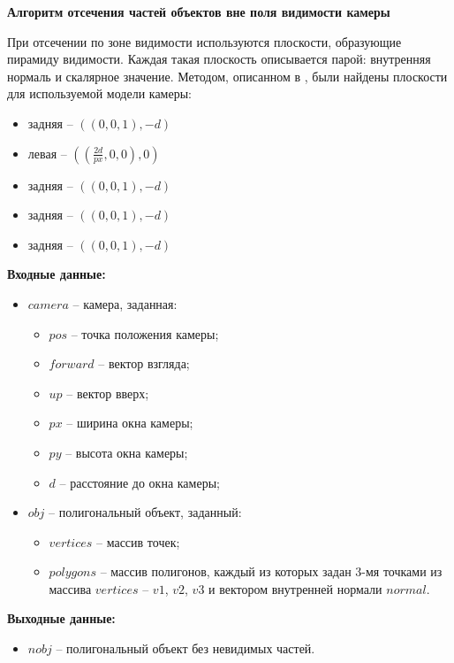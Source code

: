 \textbf{Алгоритм отсечения частей объектов вне поля видимости камеры}

При отсечении по зоне видимости используются плоскости, образующие пирамиду видимости. Каждая такая плоскость описывается парой: внутренняя нормаль и скалярное значение. Методом, описанном в \cite{gabriella}, были найдены плоскости для используемой модели камеры:

\begin{itemize}
	
\begin{itemize}
	\item задняя -- $((0, 0, 1), -d)$
	\item левая -- $((\frac{2d}{px}, 0, 0), 0)$
	\item задняя -- $((0, 0, 1), -d)$
	\item задняя -- $((0, 0, 1), -d)$
	\item задняя -- $((0, 0, 1), -d)$
\end{itemize}  

\textbf{Входные данные:}
\begin{itemize}
	\item $camera$ -- камера, заданная:
	\begin{itemize}
		\item $pos$ -- точка положения камеры;
		\item $forward$ -- вектор взгляда;
		\item $up$ -- вектор вверх;
		\item $px$ -- ширина окна камеры;
		\item $py$ -- высота окна камеры;
		\item $d$ -- расстояние до окна камеры;
	\end{itemize}
	\item $obj$ -- полигональный объект, заданный:
	\begin{itemize}
		\item $vertices$ -- массив точек;
		\item $polygons$ -- массив полигонов, каждый из которых задан 3-мя точками из массива $vertices$ -- $v1$, $v2$, $v3$ и вектором внутренней нормали $normal$.
	\end{itemize}
\end{itemize}

\textbf{Выходные данные:}
\begin{itemize}
	\item $nobj$ -- полигональный объект без невидимых частей.
\end{itemize}


\end{itemize}

